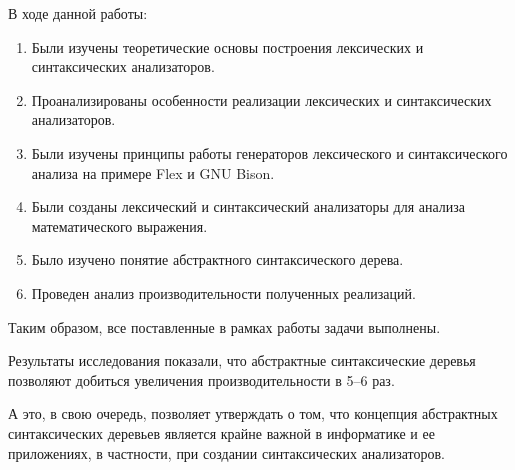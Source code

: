 В ходе данной работы:
\begin{enumerate}
    \item Были изучены теоретические основы построения лексических и
    синтаксических анализаторов.
    \item Проанализированы особенности реализации лексических и синтаксических
    анализаторов.
    \item Были изучены принципы работы генераторов лексического и
    синтаксического анализа на примере Flex и GNU Bison.
    \item Были созданы лексический и синтаксический анализаторы для анализа
    математического выражения.
    \item Было изучено понятие абстрактного синтаксического дерева.
    \item Проведен анализ производительности полученных реализаций.
\end{enumerate}

Таким образом, все поставленные в рамках работы задачи выполнены.

Результаты исследования показали, что абстрактные синтаксические деревья
позволяют добиться увеличения производительности в 5--6 раз.

А это, в свою очередь, позволяет утверждать о том, что концепция абстрактных
синтаксических деревьев является крайне важной в информатике и
ее приложениях, в частности, при создании синтаксических анализаторов.